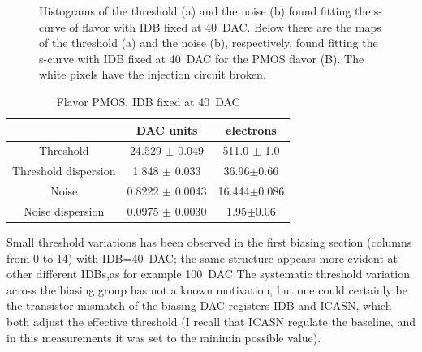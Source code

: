 \begin{figure}[h!]
            \label{fig:threshold_noise_hist}
            \caption{Histograms of the threshold (a) and the noise (b) found fitting the s-curve of  flavor with IDB fixed at \SI{40}{DAC}. Below there are the maps of the threshold (a) and the noise (b), respectively, found fitting the s-curve with IDB fixed at \SI{40}{DAC} for the PMOS flavor (B). The white pixels have the injection circuit broken.}
        \end{figure}      
        \begin{table}
                \begin{center}
                \begin{tabular}{| c | c | c |}
                \hline
                 & DAC units & electrons \\
                \hline
                \hline
                Threshold        & 24.529 $\pm$ 0.049 & 511.0 $\pm$ 1.0 \\
                Threshold dispersion & 1.848 $\pm$ 0.033 & 36.96$\pm$0.66\\
                Noise            & 0.8222 $\pm$ 0.0043 & 16.444$\pm$0.086 \\
                Noise dispersion & 0.0975 $\pm$ 0.0030 & 1.95$\pm$0.06\\
                \hline
                \end{tabular}
                \caption{Flavor PMOS, IDB fixed at \SI{40}{DAC}}
                \label{tab:Flavor_PMOS_reser}
                \end{center}
        \end{table}        
    
    
    
        Small threshold variations has been observed in the first biasing section (columns from 0 to 14) with IDB=\SI{40}{DAC}; the same structure appears more evident at other different IDBs,as for example \SI{100}{DAC}
        The systematic threshold variation across the biasing group has not a known motivation, but one could certainly be the transistor mismatch of the biasing DAC registers IDB and ICASN, which both adjust the effective threshold (I recall that ICASN regulate the baseline, and in this measurements it was set to the minimin possible value).

